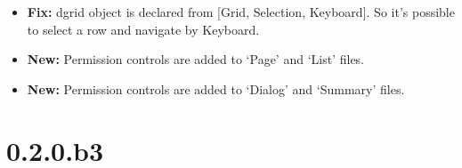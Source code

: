 \documentclass[a4paper,10pt,english]{sphinxmanual}
\begin{document}
\begin{itemize}
\begin{itemize}
\item {} 
\textbf{Fix:} dgrid object is declared from {[}Grid, Selection, Keyboard{]}. So it's
possible to select a row and navigate by Keyboard.

\item {} 
\textbf{New:} Permission controls are added to `Page' and `List' files.

\item {} 
\textbf{New:} Permission controls are added to `Dialog' and `Summary' files.

\end{itemize}

\end{itemize}


\section{0.2.0.b3}
\end{document}
